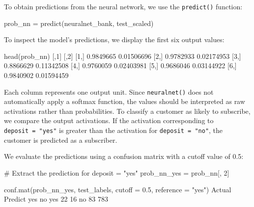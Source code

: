 \documentclass[
  11pt,
]{book}
\makeatletter
\newenvironment{Shaded}{}{}
\newcommand{\AttributeTok}[1]{#1}
\newcommand{\CommentTok}[1]{\textcolor[rgb]{0.36,0.36,0.36}{#1}}
\newcommand{\DecValTok}[1]{#1}
\newcommand{\FloatTok}[1]{#1}
\newcommand{\FunctionTok}[1]{#1}
\newcommand{\NormalTok}[1]{#1}
\newcommand{\OtherTok}[1]{\textcolor[rgb]{0.39,0.39,0.39}{#1}}
\newcommand{\StringTok}[1]{\textcolor[rgb]{0.39,0.39,0.39}{#1}}
\newenvironment{kframe}{%
\medskip{}
\setlength{\fboxsep}{.8em}
 \def\at@end@of@kframe{}%
 \ifinner\ifhmode%
  \def\at@end@of@kframe{\end{minipage}}%
  \begin{minipage}{\columnwidth}%
 \fi\fi%
 \def\FrameCommand##1{\hskip\@totalleftmargin \hskip-\fboxsep
 \colorbox{shadecolor}{##1}\hskip-\fboxsep
     \hskip-\linewidth \hskip-\@totalleftmargin \hskip\columnwidth}%
 \MakeFramed {\advance\hsize-\width
   \@totalleftmargin\z@ \linewidth\hsize
   \@setminipage}}%
 {\par\unskip\endMakeFramed%
 \at@end@of@kframe}
\renewenvironment{Shaded}{\begin{kframe}}{\end{kframe}}
\theoremstyle{definition}
\theoremstyle{definition}
\theoremstyle{definition}
\theoremstyle{definition}
\theoremstyle{remark}
\makeatother
\begin{document}
To obtain predictions from the neural network, we use the \texttt{predict()} function:

\begin{Shaded}
\begin{Highlighting}[]
\NormalTok{prob\_nn }\OtherTok{=} \FunctionTok{predict}\NormalTok{(neuralnet\_bank, test\_scaled)}
\end{Highlighting}
\end{Shaded}

To inspect the model's predictions, we display the first six output values:

\begin{Shaded}
\begin{Highlighting}[]
\FunctionTok{head}\NormalTok{(prob\_nn)}
\NormalTok{             [,}\DecValTok{1}\NormalTok{]       [,}\DecValTok{2}\NormalTok{]}
\NormalTok{   [}\DecValTok{1}\NormalTok{,] }\FloatTok{0.9849665} \FloatTok{0.01506696}
\NormalTok{   [}\DecValTok{2}\NormalTok{,] }\FloatTok{0.9782933} \FloatTok{0.02174953}
\NormalTok{   [}\DecValTok{3}\NormalTok{,] }\FloatTok{0.8866629} \FloatTok{0.11342508}
\NormalTok{   [}\DecValTok{4}\NormalTok{,] }\FloatTok{0.9760059} \FloatTok{0.02403981}
\NormalTok{   [}\DecValTok{5}\NormalTok{,] }\FloatTok{0.9686046} \FloatTok{0.03144922}
\NormalTok{   [}\DecValTok{6}\NormalTok{,] }\FloatTok{0.9840902} \FloatTok{0.01594459}
\end{Highlighting}
\end{Shaded}

Each column represents one output unit. Since \texttt{neuralnet()} does not automatically apply a softmax function, the values should be interpreted as raw activations rather than probabilities. To classify a customer as likely to subscribe, we compare the output activations. If the activation corresponding to \texttt{deposit\ =\ "yes"} is greater than the activation for \texttt{deposit\ =\ "no"}, the customer is predicted as a subscriber.

We evaluate the predictions using a confusion matrix with a cutoff value of 0.5:

\begin{Shaded}
\begin{Highlighting}[]
\CommentTok{\# Extract the prediction for \textquotesingle{}deposit = "yes"\textquotesingle{}}
\NormalTok{prob\_nn\_yes }\OtherTok{=}\NormalTok{ prob\_nn[, }\DecValTok{2}\NormalTok{] }

\FunctionTok{conf.mat}\NormalTok{(prob\_nn\_yes, test\_labels, }\AttributeTok{cutoff =} \FloatTok{0.5}\NormalTok{, }\AttributeTok{reference =} \StringTok{"yes"}\NormalTok{)}
\NormalTok{          Actual}
\NormalTok{   Predict yes  no}
\NormalTok{       yes  }\DecValTok{22}  \DecValTok{16}
\NormalTok{       no   }\DecValTok{83} \DecValTok{783}
\end{Highlighting}
\end{Shaded}
\end{document}

